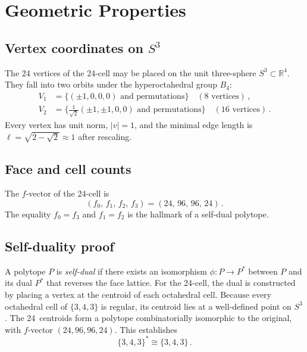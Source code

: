 \documentclass[amsmath,amssymb,aps,prd,twocolumn,superscriptaddress,nofootinbib]{revtex4-2}
\begin{document}
\section{Geometric Properties}\label{sec:geometry}

\subsection{Vertex coordinates on $S^3$}

The 24 vertices of the 24-cell may be placed on the unit three-sphere
$S^3 \subset \mathbb{R}^4$.  They fall into two orbits under the hyperoctahedral
group $B_4$:
\begin{align}
  V_1 &= \bigl\{(\pm1,0,0,0)\text{ and permutations}\bigr\}
         \quad(8\text{ vertices})\,,\label{eq:V1}\\[4pt]
  V_2 &= \bigl\{\tfrac{1}{\sqrt{2}}(\pm1,\pm1,0,0)
         \text{ and permutations}\bigr\}
         \quad(16\text{ vertices})\,.\label{eq:V2}
\end{align}
Every vertex has unit norm, $|v|=1$, and the minimal edge length is
$\ell = \sqrt{2 - \sqrt{2}} \approx 1$ after rescaling.

\subsection{Face and cell counts}

The $f$-vector of the 24-cell is
\begin{equation}\label{eq:fvec}
  (f_0,\,f_1,\,f_2,\,f_3) = (24,\,96,\,96,\,24)\,.
\end{equation}
The equality $f_0 = f_3$ and $f_1 = f_2$ is the hallmark of a self-dual
polytope.

\subsection{Self-duality proof}

A polytope $P$ is \emph{self-dual} if there exists an isomorphism
$\phi\colon P \to P^*$ between $P$ and its dual $P^*$ that reverses the
face lattice.  For the 24-cell, the dual is constructed by placing a vertex at
the centroid of each octahedral cell.  Because every octahedral cell of
$\{3,4,3\}$ is regular, its centroid lies at a well-defined point on $S^3$.
The 24~centroids form a polytope combinatorially isomorphic to the original,
with $f$-vector $(24,96,96,24)$.  This establishes
\begin{equation}\label{eq:selfdual}
  \{3,4,3\}^* \cong \{3,4,3\}\,.
\end{equation}
\end{document}

